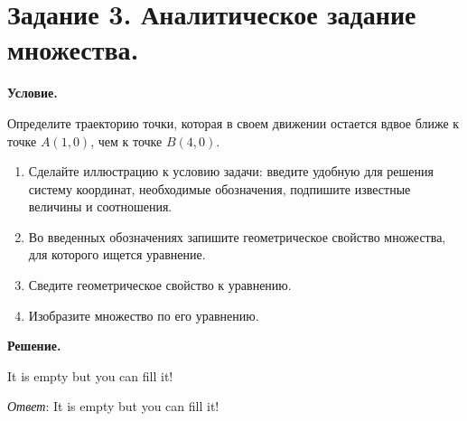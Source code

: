\section{Задание 3. Аналитическое задание множества.}

\textbf{Условие.}

Определите траекторию точки, которая в своем движении остается вдвое ближе к
точке $A(1,0)$, чем к точке $B(4,0)$.

\begin{enumerate}
    \item Сделайте иллюстрацию к условию задачи: введите удобную для решения систему
координат, необходимые обозначения, подпишите известные величины и
соотношения.
    \item Во введенных обозначениях запишите геометрическое свойство множества, для
которого ищется уравнение.
    \item Сведите геометрическое свойство к уравнению.
    \item Изобразите множество по его уравнению.
\end{enumerate}
\vspace{10mm}
\textbf{Решение.}

It is empty but you can fill it!

\textit{Ответ}: It is empty but you can fill it!
\clearpage
